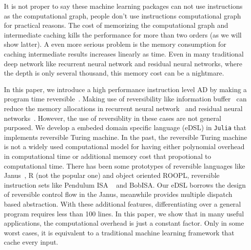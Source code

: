 \documentclass[aps,twocolumn,longbibliography,english,superscriptaddress,prr]{revtex4-1}
\newcommand{\<}{\langle}
\renewcommand{\>}{\rangle}
\theoremstyle{definition}\newtheorem{definition}{\textit{Definition}}
\begin{document}


It is not proper to say these machine learning packages can not use instructions as the computational graph, people don't use instructions computational graph for practical reasons. The cost of memorizing the computational graph and intermediate caching kills the performance for more than two orders (as we will show latter).
A even more serious problem is the memory consumption for caching intermediate results increases linearly as time. Even in many traditional deep network like recurrent neural network and residual neural networks, where the depth is only several thousand, this memory cost can be a nightmare.

In this paper, we introduce a high performance instruction level AD by making a program time reversible~\cite{Perumalla2013,Frank2017}.
Making use of reversibility like information buffer~\cite{Maclaurin2015} can reduce the memory allocations in recurrent neural network~\cite{MacKay2018} and residual neural networks~\cite{Behrmann2018}. However, the use of reversiblity in these cases are not general purposed.
We develop a embeded domain specific language (eDSL) in \texttt{Julia} that implements reversible Turing machine. In the past, the reversible Turing machine is not a widely used computational model for having either polynomial overhead in computational time or additional memory cost that propotional to computational time.
There has been some prototypes of reversible languages like Janus~\cite{Lutz1986}, R (not the popular one) and object oriented ROOPL, reversible instruction sets like Pendulum ISA ~\cite{Vieri1999} and BobISA. Our eDSL borrows the design of reversible control flow in the Janus, meanwhile provides multiple dispatch based abstraction. With these additional features, differentiating over a general program requires less than 100 lines.
In this paper, we show that in many useful applications, the computational overhead is just a constant factor. Only in some worst cases, it is equivalent to a traditional machine learning framework that cache every input.
\end{document}
